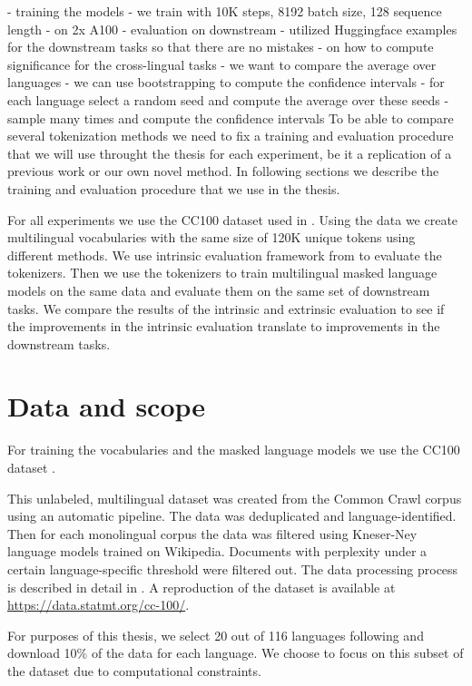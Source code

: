 - training the models
    - we train with 10K steps, 8192 batch size, 128 sequence length
    - on 2x A100
- evaluation on downstream
    - utilized Huggingface examples for the downstream tasks so that there are no mistakes
    - on how to compute significance for the cross-lingual tasks
        - we want to compare the average over languages
        - we can use bootstrapping to compute the confidence intervals
            - for each language select a random seed and compute the average over these seeds
            - sample many times and compute the confidence intervals
To be able to compare several tokenization methods we need to fix a training and evaluation procedure that we will use throught the thesis for each experiment, be it a replication of a previous work or our own novel method. In following sections we describe the training and evaluation procedure that we use in the thesis.

For all experiments we use the CC100 dataset used in \citet{conneau_unsupervised_2020}. Using the data we create multilingual vocabularies with the same size of 120K unique tokens using different methods. We use intrinsic evaluation framework from \citet{limisiewicz_tokenization_2023} to evaluate the tokenizers. Then we use the tokenizers to train multilingual masked language models on the same data and evaluate them on the same set of downstream tasks. We compare the results of the intrinsic and extrinsic evaluation to see if the improvements in the intrinsic evaluation translate to improvements in the downstream tasks.

\section{Data and scope}

For training the vocabularies and the masked language models we use the CC100 dataset \cite{conneau_unsupervised_2020}.

This unlabeled, multilingual dataset was created from the Common Crawl corpus using an automatic pipeline. The data was deduplicated and language-identified. Then for each monolingual corpus the data was filtered using Kneser-Ney language models trained on Wikipedia. Documents with perplexity under a certain language-specific threshold were filtered out. The data processing process is described in detail in \citet{wenzek_ccnet_nodate}. A reproduction of the dataset is available at \url{https://data.statmt.org/cc-100/}.

For purposes of this thesis, we select 20 out of 116 languages following \citet{limisiewicz_tokenization_2023} and download 10\% of the data for each language. We choose to focus on this subset of the dataset due to computational constraints.

